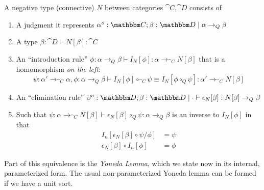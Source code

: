 \documentclass{article}
\begin{document}
\begin{definition}
  A negative type (connective) $N$ between categories $\cat C$,$\cat D$ consists of
  \begin{enumerate}
  \item A judgment it represents $\alpha^o : \cat C;\beta : \cat D
    \pipe \alpha \to_{Q} \beta$
  \item A type $\beta : \cat D \vdash N[\beta] : \cat C$
  \item An ``introduction rule'' $\phi : \alpha \to_{Q} \beta \vdash
    I_N[\phi] : \alpha \to_{\cat C} N[\beta]$ that is a homomorphism
    \emph{on the left}:
    \[ \psi : \alpha' \to_{\cat C} \alpha, \phi : \alpha \to_{Q} \beta \vdash I_N[\phi] \circ_{\cat C} \psi \equiv I_N[\phi \circ_{Q} \psi] : \alpha' \to_{\cat C} N[\beta]\]
  \item An ``elimination rule'' $\beta^o:\cat D;\beta : \cat D \pipe
    \cdot \vdash \epsilon_{N}[\beta] : N[\beta] \to_{Q} \beta$
  \item Such that $\psi : \alpha \to_{\cat C} N[\beta] \vdash \epsilon_N[\beta]
    \circ_{Q} \psi : \alpha \to_{Q} \beta$ is an inverse to
    $I_{N}[\phi]$ in that
    \begin{align*}
       I_n[\epsilon_N[\beta] \circ \psi/\phi] &= \psi \tag{$\eta$}\\
      \epsilon_N[\beta] \circ I_n[\phi] &= \phi \tag{$\beta$}
    \end{align*}
  \end{enumerate}
\end{definition}

Part of this equivalence is the \emph{Yoneda Lemma}, which we state
now in its internal, parameterized form.
The usual non-parameterized Yoneda lemma can be formed if we have a
unit sort.
\end{document}
